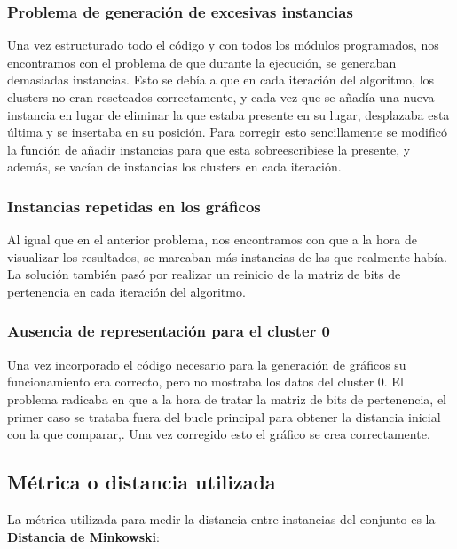 \documentclass[10pt,a4paper]{article}
\begin{document}
\subsubsection{Problema de generación de excesivas instancias}

Una vez estructurado todo el código y con todos los módulos programados, nos encontramos con el problema de que durante la ejecución, 
se generaban demasiadas instancias. Esto se debía a que en cada iteración del algoritmo, los clusters no eran reseteados correctamente, y cada vez que se añadía una nueva instancia en lugar de eliminar la que estaba presente en su lugar, desplazaba esta última y se insertaba en su posición. Para corregir esto sencillamente se modificó la función de añadir instancias para que esta sobreescribiese la presente, y además, se vacían de instancias los clusters en cada iteración.\\

\subsubsection{Instancias repetidas en los gráficos}

Al igual que en el anterior problema, nos encontramos con que a la hora de visualizar los resultados, se marcaban más instancias de las que realmente había. La solución también pasó por realizar un reinicio de la matriz de bits de pertenencia en cada iteración del algoritmo.\\

\subsubsection{Ausencia de representación para el cluster 0}

Una vez incorporado el código necesario para la generación de gráficos su funcionamiento era correcto, pero no mostraba los datos del cluster 0. El problema radicaba en que a la hora de tratar la matriz de bits de pertenencia, el primer caso se trataba fuera del bucle principal para obtener la distancia inicial con la que comparar,. Una vez corregido esto el gráfico se crea correctamente.

\subsection{Métrica o distancia utilizada}

La métrica utilizada para medir la distancia entre instancias del conjunto es la
\textbf{Distancia de Minkowski}:
\end{document}
